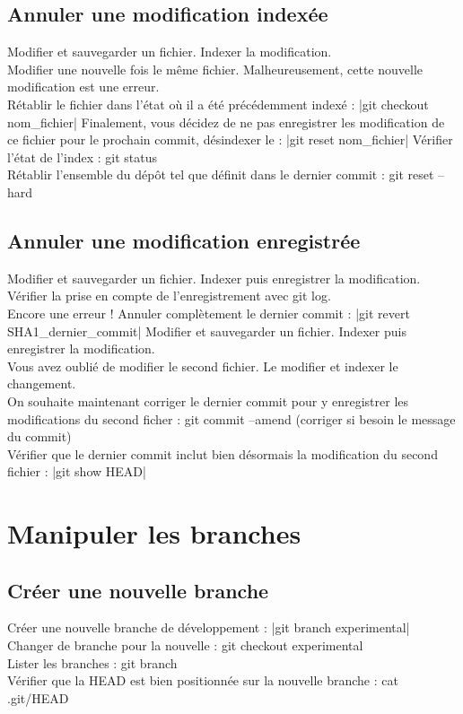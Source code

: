 \subsection{Annuler une modification indexée}
Modifier et sauvegarder un fichier. Indexer la modification.\\
Modifier une nouvelle fois le même fichier. Malheureusement, cette nouvelle modification est
une erreur.\\
Rétablir le fichier dans l'état où il a été précédemment indexé : |git checkout nom_fichier|
Finalement, vous décidez de ne pas enregistrer les modification de ce fichier pour le prochain
commit, désindexer le : |git reset nom_fichier|
Vérifier l'état de l'index : git status\\
Rétablir l'ensemble du dépôt tel que définit dans le dernier commit : git reset --hard\\
\subsection{Annuler une modification enregistrée}
Modifier et sauvegarder un fichier. Indexer puis enregistrer la modification. Vérifier la prise en
compte de l'enregistrement avec git log.\\
 Encore une erreur ! Annuler complètement le dernier commit : |git revert SHA1_dernier_commit|
 Modifier et sauvegarder un fichier. Indexer puis enregistrer la modification.\\
  Vous avez oublié de modifier le second fichier. Le modifier et indexer le changement.\\
   On souhaite maintenant corriger le dernier commit pour y enregistrer les modifications du
second ficher : git commit --amend (corriger si besoin le message du commit)\\
 Vérifier que le dernier commit inclut bien désormais la modification du second fichier :
 |git show HEAD|
\section{Manipuler les branches}
\subsection{Créer une nouvelle branche}
Créer une nouvelle branche de développement : |git branch experimental|
Changer de branche pour la nouvelle : git checkout experimental\\
Lister les branches : git branch\\
Vérifier que la HEAD est bien positionnée sur la nouvelle branche : cat .git/HEAD
